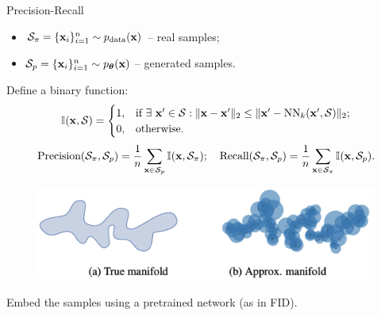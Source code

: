 \documentclass{beamer}
\begin{document}
\begin{frame}{Precision-Recall}
	\vspace{-0.2cm}
	\begin{itemize}
		\item $\mathcal{S}_{\pi} = \{\mathbf{x}_i\}_{i=1}^{n} \sim p_{\text{data}}(\mathbf{x})$ -- real samples;
		\item $\mathcal{S}_{p} = \{\mathbf{x}_i\}_{i=1}^{n} \sim p_{\boldsymbol{\theta}}(\mathbf{x})$ -- generated samples.
	\end{itemize}
	\eqpause
	Define a binary function:
	\vspace{-0.2cm}
	\[
		\mathbb{I}(\mathbf{x}, \mathcal{S}) =
		\begin{cases}
			1, & \text{if } \exists\ \mathbf{x}' \in \mathcal{S}: \| \mathbf{x} - \mathbf{x}'\|_2 \leq \| \mathbf{x}' - \text{NN}_k(\mathbf{x}', \mathcal{S})\|_2; \\
			0, & \text{otherwise.}
		\end{cases}
	\]
	\eqpause
	\vspace{-0.3cm}
	\[
		\text{Precision} (\mathcal{S}_{\pi}, \mathcal{S}_{p}) = \frac{1}{n} \sum_{\mathbf{x} \in \mathcal{S}_{p}} \mathbb{I}(\mathbf{x}, \mathcal{S}_{\pi}); \quad \text{Recall} (\mathcal{S}_{\pi}, \mathcal{S}_{p}) = \frac{1}{n} \sum_{\mathbf{x} \in \mathcal{S}_{\pi}} \mathbb{I}(\mathbf{x}, \mathcal{S}_{p}).
	\]
	\eqpause
	\vspace{-0.6cm}
	\begin{figure}
		\includegraphics[width=0.75\linewidth]{figs/pr_k_nearest}
	\end{figure}
	\eqpause
	Embed the samples using a pretrained network (as in FID).
\end{frame}
\end{document}
